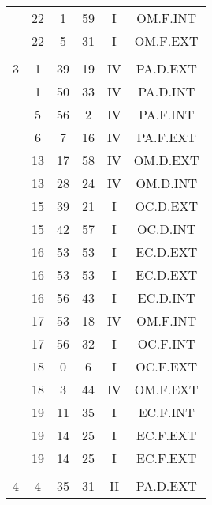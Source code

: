 \documentclass[12pt, a4paper]{article}
\begin{document}
\begin{multicols}{3}
{\begin{tabular}{c c c c c c}
	 	 	 	 & 22 & 1 & 59 & I & OM.F.INT\\%
	 	 	 	 & 22 & 5 & 31 & I & OM.F.EXT\\%
	 	 	 	 & & & & & \\%
	 	 	 	3 & 1 & 39 & 19 & IV & PA.D.EXT\\%
	 	 	 	 & 1 & 50 & 33 & IV & PA.D.INT\\%
	 	 	 	 & 5 & 56 & 2 & IV & PA.F.INT\\%
	 	 	 	 & 6 & 7 & 16 & IV & PA.F.EXT\\%
	 	 	 	 & 13 & 17 & 58 & IV & OM.D.EXT\\%
	 	 	 	 & 13 & 28 & 24 & IV & OM.D.INT\\%
	 	 	 	 & 15 & 39 & 21 & I & OC.D.EXT\\%
	 	 	 	 & 15 & 42 & 57 & I & OC.D.INT\\%
	 	 	 	 & 16 & 53 & 53 & I & EC.D.EXT\\%
	 	 	 	 & 16 & 53 & 53 & I & EC.D.EXT\\%
	 	 	 	 & 16 & 56 & 43 & I & EC.D.INT\\%
	 	 	 	 & 17 & 53 & 18 & IV & OM.F.INT\\%
	 	 	 	 & 17 & 56 & 32 & I & OC.F.INT\\%
	 	 	 	 & 18 & 0 & 6 & I & OC.F.EXT\\%
	 	 	 	 & 18 & 3 & 44 & IV & OM.F.EXT\\%
	 	 	 	 & 19 & 11 & 35 & I & EC.F.INT\\%
	 	 	 	 & 19 & 14 & 25 & I & EC.F.EXT\\%
	 	 	 	 & 19 & 14 & 25 & I & EC.F.EXT\\%
	 	 	 	 & & & & & \\%
	 	 	 	4 & 4 & 35 & 31 & II & PA.D.EXT\\%

\end{tabular}}
\end{multicols}
\end{document}
